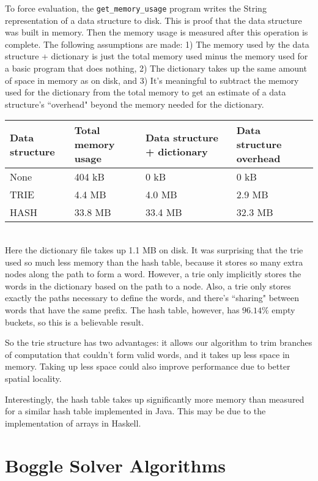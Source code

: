 \documentclass{article}
\begin{document}
To force evaluation, the \verb=get_memory_usage= program writes the String representation of a data structure to disk. This is proof that the data structure was built in memory. Then the memory usage is measured after this operation is complete. The following assumptions are made: 1) The memory used by the data structure + dictionary is just the total memory used minus the memory used for a basic program that does nothing, 2) The dictionary takes up the same amount of space in memory as on disk, and 3) It's meaningful to subtract the memory used for the dictionary from the total memory to get an estimate of a data structure's ``overhead" beyond the memory needed for the dictionary.
\\

\begin{tabular}{|l|l|l|l|}
\hline
	Data structure & Total memory usage & Data structure + dictionary & Data structure overhead\\
\hline \hline
	None & 404 kB & 0 kB & 0 kB \\
\hline
	TRIE & 4.4 MB & 4.0 MB & 2.9 MB \\
\hline
        HASH & 33.8 MB & 33.4 MB & 32.3 MB \\
\hline
\end{tabular}
\\

Here the dictionary file takes up 1.1 MB on disk. It was surprising that the trie used so much less memory than the hash table, because it stores so many extra nodes along the path to form a word. However, a trie only implicitly stores the words in the dictionary based on the path to a node. Also, a trie only stores exactly the paths necessary to define the words, and there's ``sharing" between words that have the same prefix. The hash table, however, has $96.14\%$ empty buckets, so this is a believable result.

So the trie structure has two advantages: it allows our algorithm to trim branches of computation that couldn't form valid words, and it takes up less space in memory. Taking up less space could also improve performance due to better spatial locality.

Interestingly, the hash table takes up significantly more memory than measured for a similar hash table implemented in Java. This may be due to the implementation of arrays in Haskell.


\newpage

\section{Boggle Solver Algorithms}
\end{document}
